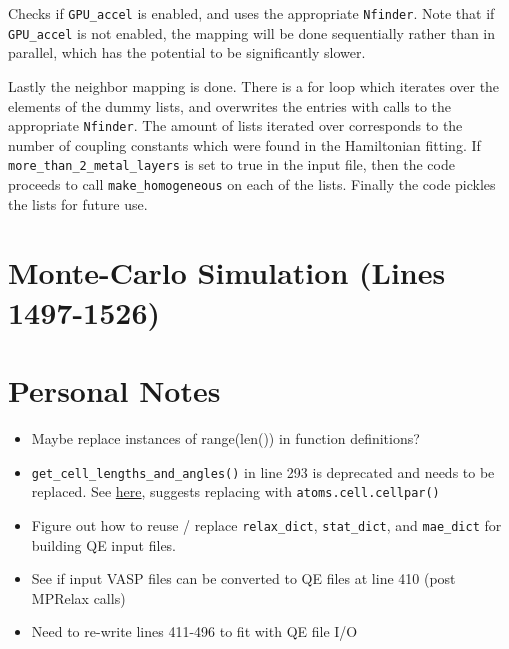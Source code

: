 \documentclass[12pt]{article}
\newcommand{\pmint}[1]{\texttt{#1}}
\begin{document}
Checks if \pmint{GPU_accel} is enabled, and uses the appropriate \pmint{Nfinder}. Note that if \pmint{GPU_accel} is not enabled, the mapping will be done sequentially rather than in parallel, which has the potential to be significantly slower. 

Lastly the neighbor mapping is done. There is a for loop which iterates over the elements of the dummy lists, and overwrites the entries with calls to the appropriate \pmint{Nfinder}. The amount of lists iterated over corresponds to the number of coupling constants which were found in the Hamiltonian fitting. If \pmint{more_than_2_metal_layers} is set to true in the input file, then the code proceeds to call \pmint{make_homogeneous} on each of the lists. Finally the code pickles the lists for future use. 
\section*{Monte-Carlo Simulation (Lines 1497-1526)} %

\section*{Personal Notes}
\begin{itemize}
    \item Maybe replace instances of range(len()) in function definitions?
    \item \texttt{get_cell_lengths_and_angles()} in line 293 is deprecated and needs to be replaced. See \href{https://wiki.fysik.dtu.dk/ase/releasenotes.html}{here}, suggests replacing with \texttt{atoms.cell.cellpar()}
    \item Figure out how to reuse / replace \pmint{relax_dict}, \pmint{stat_dict}, and \pmint{mae_dict} for building QE input files. 
    \item See if input VASP files can be converted to QE files at line 410 (post MPRelax calls)
    \item Need to re-write lines 411-496 to fit with QE file I/O
\end{itemize}
\end{document}
